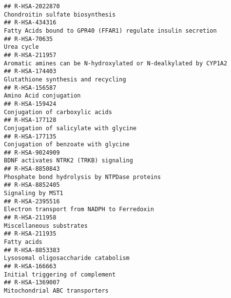 \documentclass[
]{article}
\begin{document}
\begin{verbatim}
## R-HSA-2022870                                                                                                     Chondroitin sulfate biosynthesis
## R-HSA-434316                                                                         Fatty Acids bound to GPR40 (FFAR1) regulate insulin secretion
## R-HSA-70635                                                                                                                             Urea cycle
## R-HSA-211957                                                                      Aromatic amines can be N-hydroxylated or N-dealkylated by CYP1A2
## R-HSA-174403                                                                                                   Glutathione synthesis and recycling
## R-HSA-156587                                                                                                                Amino Acid conjugation
## R-HSA-159424                                                                                                       Conjugation of carboxylic acids
## R-HSA-177128                                                                                                Conjugation of salicylate with glycine
## R-HSA-177135                                                                                                  Conjugation of benzoate with glycine
## R-HSA-9024909                                                                                                BDNF activates NTRK2 (TRKB) signaling
## R-HSA-8850843                                                                                        Phosphate bond hydrolysis by NTPDase proteins
## R-HSA-8852405                                                                                                                    Signaling by MST1
## R-HSA-2395516                                                                                          Electron transport from NADPH to Ferredoxin
## R-HSA-211958                                                                                                              Miscellaneous substrates
## R-HSA-211935                                                                                                                           Fatty acids
## R-HSA-8853383                                                                                                 Lysosomal oligosaccharide catabolism
## R-HSA-166663                                                                                                      Initial triggering of complement
## R-HSA-1369007                                                                                                       Mitochondrial ABC transporters

\end{verbatim}
\end{document}
